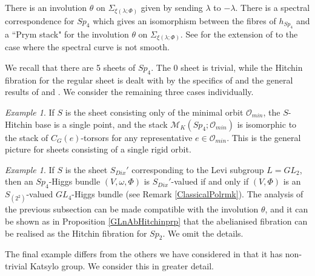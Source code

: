 \documentclass{amsart}
\theoremstyle{remark}
\newtheorem{example}[theorem]{Example}
\numberwithin{theorem}{section}
\numberwithin{equation}{section}
\begin{document}
There is an involution $\theta$ on ${\Sigma}_{\xi(\lambda;\Phi)}$ given by sending $\lambda$ to $-\lambda$. There is a spectral correspondence for $Sp_4$ which gives an isomorphism between the fibres of $h_{Sp_4}$ and a ``Prym stack" for the involution $\theta$ on ${\Sigma}_{\xi(\lambda;\Phi)}$. See \cite[Section 4.3]{Carbone} for the extension of \cite{Hitchin2} to the case where the spectral curve is not smooth.

We recall that there are 5 sheets of $Sp_4$. The $0$ sheet is trivial, while the Hitchin fibration for the regular sheet is dealt with by the specifics of \cite{Hitchin2} and the general results of \cite{DG} and \cite{Ngo1}. We consider the remaining three cases individually.

\begin{example}\label{Sp4MinOrbexm}
    If $S$ is the sheet consisting only of the minimal orbit $\mathcal O_{min}$, the $S$-Hitchin base is a single point, and the stack $\mathcal M_K(Sp_4;\mathcal O_{min})$ is isomorphic to the stack of $C_G(e)$-torsors for any representative $e \in \mathcal O_{min}$. This is the general picture for sheets consisting of a single rigid orbit.
\end{example}

\begin{example}\label{Sp4SDix1exm}
    If $S$ is the sheet $S_{Dix}'$ corresponding to the Levi subgroup $L = GL_2$, then an $Sp_4$-Higgs bundle $(V,\omega,\Phi)$ is $S_{Dix}'$-valued if and only if $(V,\Phi)$ is an $S_{(2^2)}$-valued $GL_4$-Higgs bundle (see Remark \ref{ClassicalPolrmk}). The analysis of the previous subsection can be made compatible with the involution $\theta$, and it can be shown as in Proposition \ref{GLnAbHitchinprp} that the abelianised fibration can be realised as the Hitchin fibration for $Sp_2$. We omit the details.
\end{example}

The final example differs from the others we have considered in that it has non-trivial Katsylo group. We consider this in greater detail.
\end{document}
